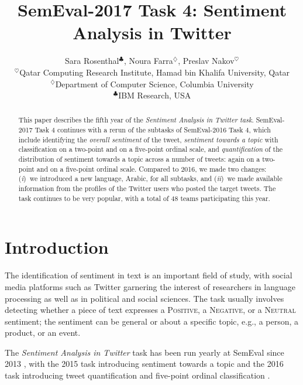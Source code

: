 \documentclass[11pt,a4paper]{article}
\title{SemEval-2017 Task 4: Sentiment Analysis in Twitter}
\author{
Sara Rosenthal$^{\clubsuit}$, Noura Farra$^{\diamondsuit}$, Preslav Nakov$^{\heartsuit}$ \\
$^{\heartsuit}$Qatar Computing Research Institute,
Hamad bin Khalifa University, Qatar \\
$^{\diamondsuit}$Department of Computer Science, Columbia University \\
$^{\clubsuit}$IBM Research, USA \\
}
\date{}
\begin{document}
\maketitle
\begin{abstract}
This paper describes the fifth year of the \emph{Sentiment Analysis in Twitter task}. SemEval-2017 Task 4 continues with a rerun of the subtasks of SemEval-2016 Task 4, which include identifying the \textit{overall sentiment} of the tweet, \textit{sentiment towards a topic} with classification on a two-point and on a five-point ordinal scale, and \textit{quantification} of the distribution of sentiment towards a topic across a number of tweets: again on a two-point and on a five-point ordinal scale. Compared to 2016, we made two changes: (\emph{i})~we introduced a new language, Arabic, for all subtasks, and (\emph{ii})~we made available information from the profiles of the Twitter users who posted the target tweets. The task continues to be very popular, with a total of 48 teams participating this year.
\end{abstract}


\section{Introduction}
\label{sec:intro}
The identification of sentiment in text is an important field of study, with social media platforms such as Twitter garnering the interest of researchers in language processing as well as in political and social sciences. The task usually involves detecting whether a piece of text expresses a \textsc{Positive}, a \textsc{Negative}, or a \textsc{Neutral} sentiment; %
the sentiment can be general or about a specific topic, e.g., a person, a product, or an event.

The \emph{Sentiment Analysis in Twitter} task has been run yearly at SemEval since 2013 \cite{Nakov:2013ty,rosenthal-EtAl:2014:SemEval,Nakov:2016rm}, with the 2015 task introducing sentiment towards a topic \cite{rosenthal-EtAl:2015:SemEval} and the 2016 task introducing tweet quantification and five-point ordinal classification \cite{nakov-EtAl:2016:SemEval1}.
\end{document}

